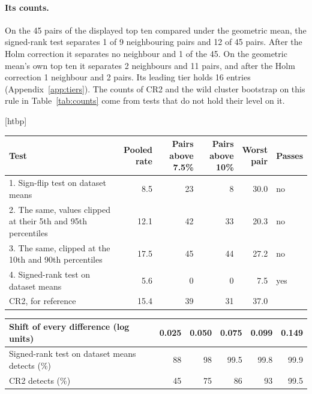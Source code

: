 \documentclass{article}
\makeatletter
\renewenvironment{table}
  {\setlength{\abovecaptionskip}{6\p@}%
   \setlength{\belowcaptionskip}{\z@}%
   \@float{table}}
  {\end@float}
\makeatother
\begin{document}
\paragraph{Its counts.} On the 45 pairs of the displayed top ten compared under the geometric
mean, the signed-rank test separates 1 of 9 neighbouring pairs and 12 of 45 pairs. After the
Holm correction it separates no neighbour and 1 of the 45. On the geometric mean's own top ten
it separates 2 neighbours and 11 pairs, and after the Holm correction 1 neighbour and 2 pairs.
Its leading tier holds 16 entries (Appendix~\ref{app:tiers}). The counts of CR2 and the wild
cluster bootstrap on this rule in Table~\ref{tab:counts} come from tests that do not hold
their level on it.

\begin{table}[htbp]
\centering
\small
\begin{tabular}{@{}p{6.4cm}rrrrl@{}}
\toprule
Test & \shortstack[r]{Pooled\\rate} & \shortstack[r]{Pairs\\above 7.5\%} &
\shortstack[r]{Pairs\\above 10\%} & \shortstack[r]{Worst\\pair} & Passes \\
\midrule
1. Sign-flip test on dataset means & 8.5 & 23 & 8 & 30.0 & no \\
2. The same, values clipped at their 5th and 95th percentiles & 12.1 & 42 & 33 & 20.3 & no \\
3. The same, clipped at the 10th and 90th percentiles & 17.5 & 45 & 44 & 27.2 & no \\
4. Signed-rank test on dataset means & 5.6 & 0 & 0 & 7.5 & yes \\
CR2, for reference & 15.4 & 39 & 31 & 37.0 & \\
\bottomrule
\end{tabular}

\vspace{6pt}
\begin{tabular}{@{}p{6.4cm}rrrrr@{}}
\toprule
Shift of every difference (log units) & 0.025 & 0.050 & 0.075 & 0.099 & 0.149 \\
\midrule
Signed-rank test on dataset means detects (\%) & 88 & 98 & 99.5 & 99.8 & 99.9 \\
CR2 detects (\%) & 45 & 75 & 86 & 93 & 99.5 \\
\bottomrule
\end{tabular}
\caption{Tests of the geometric mean of scaled error on the 45 pairs of the displayed top ten.
Upper part: rate (\%) at which each test declares a difference between resampled real pairs
that have none, against a target of 5\%. Each pair is resampled 1{,}000 times. Lower part:
rate at which a fixed shift of every difference is detected in the same resamples. CR2
declares a difference 15.4\% of the time with no shift at all, against 15.7\% in the separate resamples of Table~\ref{tab:calib}.}
\label{tab:gmeanlevel}
\end{table}
\end{document}
